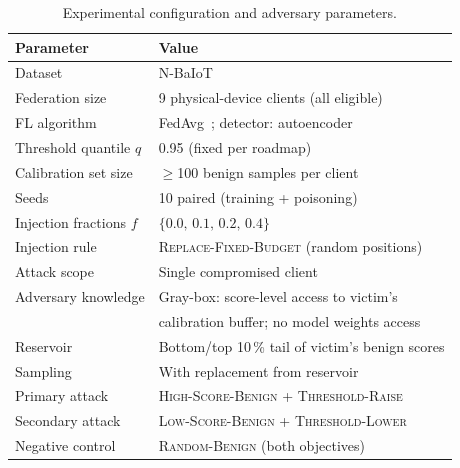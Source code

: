 \begin{table}[tb]
\caption{Experimental configuration and adversary parameters.}
\label{tab:config}
\centering
\small
\begin{tabular}{@{}ll@{}}
\toprule
Parameter & Value \\
\midrule
Dataset & N-BaIoT~\cite{meidan2018nbaiot} \\
Federation size & 9 physical-device clients (all eligible) \\
FL algorithm & FedAvg~\cite{mcmahan2017fedavg}; detector: autoencoder \\
Threshold quantile $q$ & 0.95 (fixed per roadmap) \\
Calibration set size & $\ge$100 benign samples per client \\
Seeds & 10 paired (training + poisoning) \\
Injection fractions $f$ & $\{0.0,\,0.1,\,0.2,\,0.4\}$ \\
Injection rule & \textsc{Replace-Fixed-Budget} (random positions) \\
Attack scope & Single compromised client \\
\midrule
Adversary knowledge & Gray-box: score-level access to victim's \\
 & calibration buffer; no model weights access \\
Reservoir & Bottom/top 10\,\% tail of victim's benign scores \\
Sampling & With replacement from reservoir \\
\midrule
Primary attack & \textsc{High-Score-Benign} + \textsc{Threshold-Raise} \\
Secondary attack & \textsc{Low-Score-Benign} + \textsc{Threshold-Lower} \\
Negative control & \textsc{Random-Benign} (both objectives) \\
\bottomrule
\end{tabular}
\end{table}
